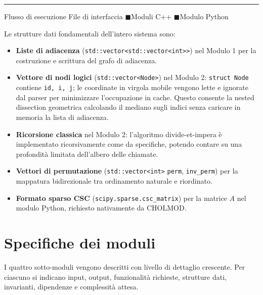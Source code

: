 \documentclass[a4paper,12pt]{article}
\begin{document}
\begin{center}
\begin{tikzpicture}
\end{tikzpicture}

\smallskip
{\footnotesize\rmfamily
\rule{1.5em}{0.8pt}\quad Flusso di esecuzione\qquad
{}\quad File di interfaccia\qquad
{\color{blue!60!black}$\blacksquare$}\quad Moduli C++\qquad
{\color{orange!70!black}$\blacksquare$}\quad Modulo Python
}
\end{center}

\bigskip

\noindent Le strutture dati fondamentali dell'intero sistema sono:

\begin{itemize}
  \item \textbf{Liste di adiacenza} (\texttt{std::vector<std::vector<int>>}) nel Modulo 1 per la costruzione e scrittura del grafo di adiacenza.
  \item \textbf{Vettore di nodi logici} (\texttt{std::vector<Node>}) nel Modulo 2: \texttt{struct Node} contiene \texttt{id, i, j}; le coordinate in virgola mobile vengono lette e ignorate dal parser per minimizzare l'occupazione in cache. Questo consente la nested dissection geometrica calcolando il mediano sugli indici senza caricare in memoria la lista di adiacenza.
  \item \textbf{Ricorsione classica} nel Modulo 2: l'algoritmo divide-et-impera è implementato ricorsivamente come da specifiche, potendo contare su una profondità limitata dell'albero delle chiamate.
  \item \textbf{Vettori di permutazione} (\texttt{std::vector<int>} \texttt{perm}, \texttt{inv\_perm}) per la mappatura bidirezionale tra ordinamento naturale e riordinato.
  \item \textbf{Formato sparso CSC} (\texttt{scipy.sparse.csc\_matrix}) per la matrice $A$ nel modulo Python, richiesto nativamente da CHOLMOD.
\end{itemize}

\newpage
\section{Specifiche dei moduli}

I quattro sotto-moduli vengono descritti con livello di dettaglio crescente. Per ciascuno si indicano input, output, funzionalità richieste, strutture dati, invarianti, dipendenze e complessità attesa.
\end{document}
